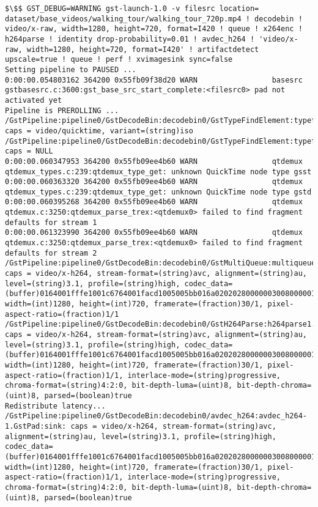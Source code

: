 \documentclass[12pt,oneside]{book}
\begin{document}
\begin{lstlisting}
$\$$ GST_DEBUG=WARNING gst-launch-1.0 -v filesrc location= dataset/base_videos/walking_tour/walking_tour_720p.mp4 ! decodebin ! video/x-raw, width=1280, height=720, format=I420 ! queue ! x264enc ! h264parse ! identity drop-probability=0.01 ! avdec_h264 ! 'video/x-raw, width=1280, height=720, format=I420' ! artifactdetect upscale=true ! queue ! perf ! xvimagesink sync=false
Setting pipeline to PAUSED ...
0:00:00.054803162 364200 0x55fb09f38d20 WARN                 basesrc gstbasesrc.c:3600:gst_base_src_start_complete:<filesrc0> pad not activated yet
Pipeline is PREROLLING ...
/GstPipeline:pipeline0/GstDecodeBin:decodebin0/GstTypeFindElement:typefind.GstPad:src: caps = video/quicktime, variant=(string)iso
/GstPipeline:pipeline0/GstDecodeBin:decodebin0/GstTypeFindElement:typefind.GstPad:src: caps = NULL
0:00:00.060347953 364200 0x55fb09ee4b60 WARN                 qtdemux qtdemux_types.c:239:qtdemux_type_get: unknown QuickTime node type gsst
0:00:00.060363320 364200 0x55fb09ee4b60 WARN                 qtdemux qtdemux_types.c:239:qtdemux_type_get: unknown QuickTime node type gstd
0:00:00.060395268 364200 0x55fb09ee4b60 WARN                 qtdemux qtdemux.c:3250:qtdemux_parse_trex:<qtdemux0> failed to find fragment defaults for stream 1
0:00:00.061323990 364200 0x55fb09ee4b60 WARN                 qtdemux qtdemux.c:3250:qtdemux_parse_trex:<qtdemux0> failed to find fragment defaults for stream 2
/GstPipeline:pipeline0/GstDecodeBin:decodebin0/GstMultiQueue:multiqueue0.GstPad:src_0: caps = video/x-h264, stream-format=(string)avc, alignment=(string)au, level=(string)3.1, profile=(string)high, codec_data=(buffer)0164001fffe1001c6764001facd1005005bb016a02020280000003008000001e078c188901000468eb8f2c, width=(int)1280, height=(int)720, framerate=(fraction)30/1, pixel-aspect-ratio=(fraction)1/1
/GstPipeline:pipeline0/GstDecodeBin:decodebin0/GstH264Parse:h264parse1.GstPad:src: caps = video/x-h264, stream-format=(string)avc, alignment=(string)au, level=(string)3.1, profile=(string)high, codec_data=(buffer)0164001fffe1001c6764001facd1005005bb016a02020280000003008000001e078c188901000468eb8f2c, width=(int)1280, height=(int)720, framerate=(fraction)30/1, pixel-aspect-ratio=(fraction)1/1, interlace-mode=(string)progressive, chroma-format=(string)4:2:0, bit-depth-luma=(uint)8, bit-depth-chroma=(uint)8, parsed=(boolean)true
Redistribute latency...
/GstPipeline:pipeline0/GstDecodeBin:decodebin0/avdec_h264:avdec_h264-1.GstPad:sink: caps = video/x-h264, stream-format=(string)avc, alignment=(string)au, level=(string)3.1, profile=(string)high, codec_data=(buffer)0164001fffe1001c6764001facd1005005bb016a02020280000003008000001e078c188901000468eb8f2c, width=(int)1280, height=(int)720, framerate=(fraction)30/1, pixel-aspect-ratio=(fraction)1/1, interlace-mode=(string)progressive, chroma-format=(string)4:2:0, bit-depth-luma=(uint)8, bit-depth-chroma=(uint)8, parsed=(boolean)true

\end{lstlisting}
\end{document}

